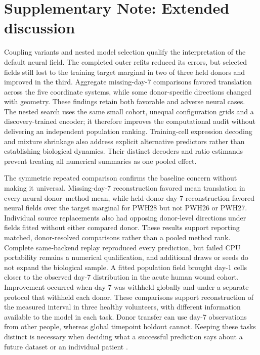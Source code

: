 \documentclass[10pt,a4paper]{article}
\begin{document}
\section*{Supplementary Note: Extended discussion}

Coupling variants and nested model selection qualify the interpretation of the default neural field. The completed outer refits reduced its errors, but selected fields still lost to the training target marginal in two of three held donors and improved in the third. Aggregate missing-day-7 comparisons favored translation across the five coordinate systems, while some donor-specific directions changed with geometry. These findings retain both favorable and adverse neural cases. The nested search uses the same small cohort, unequal configuration grids and a discovery-trained encoder; it therefore improves the computational audit without delivering an independent population ranking. Training-cell expression decoding and mixture shrinkage also address explicit alternative predictors rather than establishing biological dynamics. Their distinct decoders and ratio estimands prevent treating all numerical summaries as one pooled effect.

The symmetric repeated comparison confirms the baseline concern without making it universal. Missing-day-7 reconstruction favored mean translation in every neural donor--method mean, while held-donor day-7 reconstruction favored neural fields over the target marginal for PWH28 but not PWH26 or PWH27. Individual source replacements also had opposing donor-level directions under fields fitted without either compared donor. These results support reporting matched, donor-resolved comparisons rather than a pooled method rank. Complete same-backend replay reproduced every prediction, but failed CPU portability remains a numerical qualification, and additional draws or seeds do not expand the biological sample.
A fitted population field brought day-1 cells closer to the observed day-7 distribution in the acute human wound cohort. Improvement occurred when day 7 was withheld globally and under a separate protocol that withheld each donor. These comparisons support reconstruction of the measured interval in three healthy volunteers, with different information available to the model in each task. Donor transfer can use day-7 observations from other people, whereas global timepoint holdout cannot. Keeping these tasks distinct is necessary when deciding what a successful prediction says about a future dataset or an individual patient \citep{liu2025_wound,roberts2017}.
\end{document}
